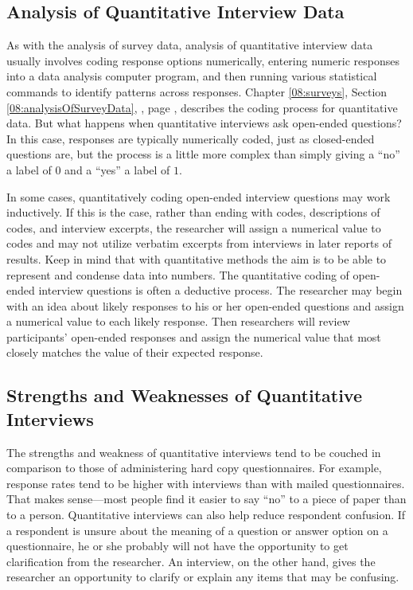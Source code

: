 \subsection{Analysis of Quantitative Interview Data}

As with the analysis of survey data, analysis of quantitative interview data usually involves coding response options numerically, entering numeric responses into a data analysis computer program, and then running various statistical commands to identify patterns across responses. Chapter \ref{08:surveys}, Section \ref{08:analysisOfSurveyData}, , page \pageref{08:analysisOfSurveyData}, describes the coding process for quantitative data. But what happens when quantitative interviews ask open-ended questions? In this case, responses are typically numerically coded, just as closed-ended questions are, but the process is a little more complex than simply giving a ``no'' a label of $ 0 $ and a ``yes'' a label of $ 1 $.

In some cases, quantitatively coding open-ended interview questions may work inductively. If this is the case, rather than ending with codes, descriptions of codes, and interview excerpts, the researcher will assign a numerical value to codes and may not utilize verbatim excerpts from interviews in later reports of results. Keep in mind that with quantitative methods the aim is to be able to represent and condense data into numbers. The quantitative coding of open-ended interview questions is often a deductive process. The researcher may begin with an idea about likely responses to his or her open-ended questions and assign a numerical value to each likely response. Then researchers will review participants' open-ended responses and assign the numerical value that most closely matches the value of their expected response.

\subsection{Strengths and Weaknesses of Quantitative Interviews}

The strengths and weakness of quantitative interviews tend to be couched in comparison to those of administering hard copy questionnaires. For example, response rates tend to be higher with interviews than with mailed questionnaires. That makes sense---most people find it easier to say ``no'' to a piece of paper than to a person. Quantitative interviews can also help reduce respondent confusion. If a respondent is unsure about the meaning of a question or answer option on a questionnaire, he or she probably will not have the opportunity to get clarification from the researcher. An interview, on the other hand, gives the researcher an opportunity to clarify or explain any items that may be confusing.

